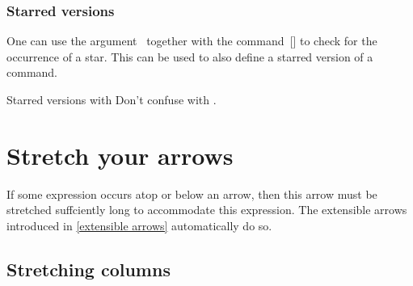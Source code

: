 \subsubsection{Starred versions}

One can use the argument~\optname{*} together with the command~[\comname] to check for the occurrence of a star.
This can be used to also define a starred version of a command.
\begin{showlatex}{Starred versions with }
Don’t confuse  with .
\end{showlatex}





\section{Stretch your arrows}

If some expression occurs atop or below an arrow, then this arrow must be stretched suffciently long to accommodate this expression.
The extensible arrows introduced in \cref{extensible arrows} automatically do so.



\subsection{Stretching columns}

